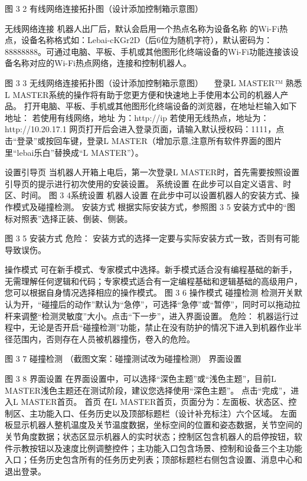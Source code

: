 图 3 2  有线网络连接拓扑图（设计添加控制箱示意图）

无线网络连接
机器人出厂后，默认会启用一个热点名称为设备名称  的Wi-Fi热点，设备名称格式如：Lebai-cKGr2D（后6位为随机字符），默认密码为：88888888。可通过电脑、平板、手机或其他图形化终端设备的Wi-Fi功能连接该设备名称对应的Wi-Fi热点网络，连接和控制机器人。
 
图 3 3 无线网络连接拓扑图（设计添加控制箱示意图） 
登录L MASTER™
熟悉L MASTER系统的操作将有助于您更方便和快速地上手使用本公司的机器人产品。
打开电脑、平板、手机或其他图形化终端设备的浏览器，在地址栏输入如下地址：
若使用有线网络，地址  为：http://ip 
若使用无线热点，地址为： http://10.20.17.1 
网页打开后会进入登录页面，请输入默认授权码：1111，点击“登录”或按回车键，登录L MASTER（增加示意,注意所有软件界面的图片里“lebai乐白”替换成“L MASTER”）。
 
设置引导页
当机器人开箱上电后，第一次登录L MASTER时，首先需要按照设置引导页的提示进行初次使用的安装设置。
系统设置
在此步可以自定义语言、时区、时间。 
图 3 4系统设置
机器人设置
在此步中可以设置机器人的安装方式、操作模式及碰撞检测。
	安装方式
根据实际安装方式，参照图 3 5 安装方式中的“图标对照表”选择正装、倒装、侧装。
 
图 3 5 安装方式
 	危险：
安装方式的选择一定要与实际安装方式一致，否则有可能导致误伤。

	操作模式
可在新手模式、专家模式中选择。新手模式适合没有编程基础的新手，无需理解任何逻辑和代码；专家模式适合有一定编程基础和逻辑基础的高级用户，您可以根据自身情况选择相应的操作模式。 
图 3 6   操作模式
	碰撞检测
检测开关默认为开，“碰撞后的动作”默认为“急停”，可选择“急停”或“暂停”，同时可以拖动拉杆来调整“检测灵敏度”大小。点击“下一步”，进入界面设置。
 	危险：
机器运行过程中，无论是否开启“碰撞检测”功能，禁止在没有防护的情况下进入到机器作业半径范围内，否则存在人员被机器撞伤，卷入的危险。

 
图 3 7   碰撞检测
（截图文案：碰撞测试改为碰撞检测）
界面设置
 
图 3 8 界面设置
在界面设置中，可以选择“深色主题”或“浅色主题”，目前L MASTER浅色主题还在测试阶段，建议您选择使用“深色主题”。
点击“完成”，进入L MASTER首页。
首页
在L MASTER首页，页面分为：左面板、状态区、控制区、主功能入口、任务历史以及顶部标题栏（设计补充标注）六个区域。
左面板显示机器人整机温度及关节温度数据，坐标空间的位置和姿态数据，关节空间的关节角度数据；状态区显示机器人的实时状态；控制区包含机器人的启停按钮，软件示教按钮以及速度比例调整控件；主功能入口包含场景、控制和设备三个主功能入口；任务历史包含所有的任务历史列表；顶部标题栏右侧包含设置、消息中心和退出登录。
 
